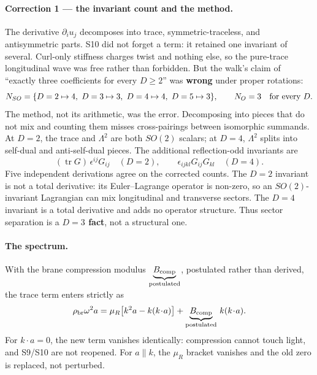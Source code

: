 \paragraph{Correction 1 --- the invariant count and the method.}
The derivative \(\partial_i u_j\) decomposes into trace, symmetric-traceless,
and antisymmetric parts. S10 did not forget a term: it retained one invariant
of several. Curl-only
stiffness charges twist and nothing else, so the pure-trace longitudinal wave
was free rather than forbidden. But the walk's claim of ``exactly three
coefficients for every \(D\geq2\)'' was \textbf{wrong} under proper rotations:
\[
  N_{SO}=\{D=2\mapsto4,\ D=3\mapsto3,\ D=4\mapsto4,\ D=5\mapsto3\},
  \qquad N_O=3\quad\hbox{for every }D.
\]
The method, not its arithmetic, was the error. Decomposing into pieces that do
not mix and counting them misses cross-pairings between isomorphic summands.
At \(D=2\), the trace and \(\Lambda^2\) are both \(SO(2)\) scalars; at \(D=4\),
\(\Lambda^2\) splits into self-dual and anti-self-dual pieces. The additional
reflection-odd invariants are
\[
  (\operatorname{tr}G)\,\epsilon^{ij}G_{ij}\quad(D=2),
  \qquad
  \epsilon_{ijkl}G_{ij}G_{kl}\quad(D=4).
\]
Five independent derivations agree on the corrected counts. The \(D=2\)
invariant is not a total derivative: its Euler--Lagrange operator is non-zero,
so an \(SO(2)\)-invariant Lagrangian can mix longitudinal and transverse
sectors. The \(D=4\) invariant is a total derivative and adds no operator
structure. Thus sector separation is a \textbf{\(D=3\) fact}, not a structural
one.

\newcommand{\SXIcomp}{\underbrace{B_{\mathrm{comp}}}_{\text{\scriptsize postulated}}}

\paragraph{The spectrum.}
With the brane compression modulus \(\SXIcomp\), postulated rather than
derived, the trace term enters strictly as
\[
  \rho_{\mathrm{br}}\omega^2a
  =\mu_R\bigl[k^2a-k(k\!\cdot\!a)\bigr]
   +\SXIcomp\,k(k\!\cdot\!a).
\]
For \(k\!\cdot\!a=0\), the new term vanishes identically: compression cannot
touch light, and S9/S10 are not reopened. For \(a\parallel k\), the
\(\mu_R\) bracket vanishes and the old zero is replaced, not perturbed.

